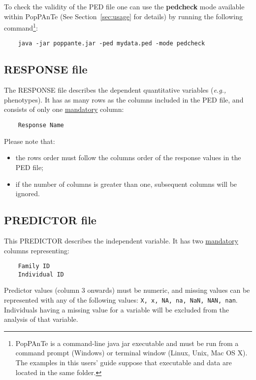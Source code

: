 \documentclass[a4paper,9pt]{article}
\newcommand{\minusitem}{\item[-]}
\begin{document}
\noindent
To check the validity of the PED file one can use the \textbf{pedcheck} mode available within PopPAnTe (See Section~\ref{sec:usage} for details) by running the following command\footnote{PopPAnTe is a command-line java jar executable and must be run from a command prompt (Windows) or terminal window (Linux, Unix, Mac OS X). The examples in this users' guide suppose that executable and data are located in the same folder.}:
\begin{Verbatim}
	java -jar poppante.jar -ped mydata.ped -mode pedcheck
\end{Verbatim}


\newpage

\subsection{RESPONSE file}
\label{sec:responsefile}

The RESPONSE file describes the dependent quantitative variables (\emph{e.g.,} phenotypes).
It has as many rows as the columns included in the PED file, and consists of only one \underline{mandatory} column:

\begin{Verbatim}
	Response Name
\end{Verbatim}

\vspace{0.3cm}

\noindent
Please note that:
\begin{itemize}
	\setlength{\itemsep}{-3pt}
	\minusitem the rows order must follow the columns order of the response values in the PED file;
	\minusitem if the number of columns is greater than one, subsequent columns will be ignored.
\end{itemize}

\subsection{PREDICTOR file}

This PREDICTOR describes the independent variable. It has two \underline{mandatory} columns representing: 

\begin{Verbatim}
	Family ID
	Individual ID
\end{Verbatim}

\noindent
Predictor values (column 3 onwards) must be numeric, and missing values can be represented with any of the following values: \texttt{X, x, NA, na, NaN, NAN, nan}. Individuals having a missing value for a variable will be excluded from the analysis of that variable.
\end{document}
